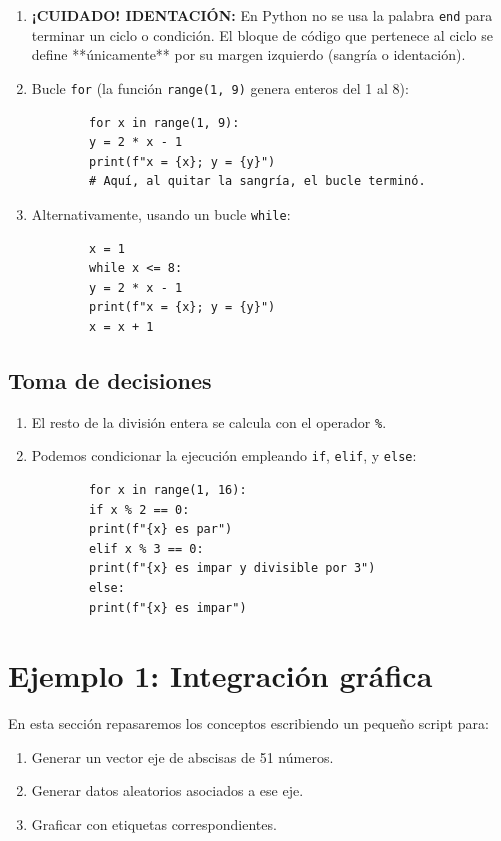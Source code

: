 \documentclass[11pt,a4paper,openany]{book}
\begin{document}
\begin{enumerate}
	\item \textbf{¡CUIDADO! IDENTACIÓN:} En Python no se usa la palabra \texttt{end} para terminar un ciclo o condición. El bloque de código que pertenece al ciclo se define **únicamente** por su margen izquierdo (sangría o identación).
	
	\item Bucle \texttt{for} (la función \texttt{range(1, 9)} genera enteros del 1 al 8):
	\begin{verbatim}
		for x in range(1, 9):
		y = 2 * x - 1
		print(f"x = {x}; y = {y}")
		# Aquí, al quitar la sangría, el bucle terminó.
	\end{verbatim}
	
	\item Alternativamente, usando un bucle \texttt{while}:
	\begin{verbatim}
		x = 1
		while x <= 8:
		y = 2 * x - 1
		print(f"x = {x}; y = {y}")
		x = x + 1 
	\end{verbatim}
\end{enumerate}

\subsection{Toma de decisiones}

\begin{enumerate}
	\item El resto de la división entera se calcula con el operador \texttt{\%}.
	\item Podemos condicionar la ejecución empleando \texttt{if}, \texttt{elif}, y \texttt{else}:
	\begin{verbatim}
		for x in range(1, 16):
		if x % 2 == 0:
		print(f"{x} es par")
		elif x % 3 == 0:
		print(f"{x} es impar y divisible por 3")
		else:
		print(f"{x} es impar")
	\end{verbatim}
\end{enumerate}

\section{Ejemplo 1: Integración gráfica}

En esta sección repasaremos los conceptos escribiendo un pequeño script para:
\begin{enumerate}
	\item Generar un vector eje de abscisas de 51 números.
	\item Generar datos aleatorios asociados a ese eje.
	\item Graficar con etiquetas correspondientes.
\end{enumerate}
\end{document}
